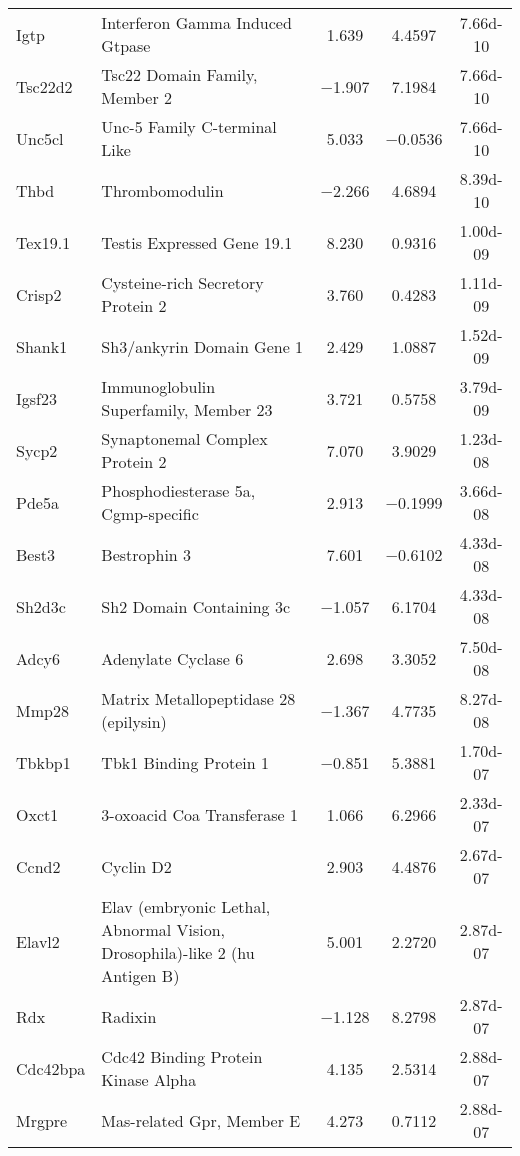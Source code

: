 {\begin{longtable}[l]{p{2.5cm}p{6.6cm}ccc}
Igtp	& Interferon Gamma Induced Gtpase	& \num{ 1.639}	& \num{ 4.4597}	& \num{7.66d-10}\\ 
Tsc22d2	& Tsc22 Domain Family, Member 2	& \num{-1.907}	& \num{ 7.1984}	& \num{7.66d-10}\\ 
Unc5cl	& Unc-5 Family C-terminal Like	& \num{ 5.033}	& \num{-0.0536}	& \num{7.66d-10}\\ 
Thbd	& Thrombomodulin	& \num{-2.266}	& \num{ 4.6894}	& \num{8.39d-10}\\ 
Tex19.1	& Testis Expressed Gene 19.1	& \num{ 8.230}	& \num{ 0.9316}	& \num{1.00d-09}\\ 
Crisp2	& Cysteine-rich Secretory Protein 2	& \num{ 3.760}	& \num{ 0.4283}	& \num{1.11d-09}\\ 
Shank1	& Sh3/ankyrin Domain Gene 1	& \num{ 2.429}	& \num{ 1.0887}	& \num{1.52d-09}\\ 
Igsf23	& Immunoglobulin Superfamily, Member 23	& \num{ 3.721}	& \num{ 0.5758}	& \num{3.79d-09}\\ 
Sycp2	& Synaptonemal Complex Protein 2	& \num{ 7.070}	& \num{ 3.9029}	& \num{1.23d-08}\\ 
Pde5a	& Phosphodiesterase 5a, Cgmp-specific	& \num{ 2.913}	& \num{-0.1999}	& \num{3.66d-08}\\ 
Best3	& Bestrophin 3	& \num{ 7.601}	& \num{-0.6102}	& \num{4.33d-08}\\ 
Sh2d3c	& Sh2 Domain Containing 3c	& \num{-1.057}	& \num{ 6.1704}	& \num{4.33d-08}\\ 
Adcy6	& Adenylate Cyclase 6	& \num{ 2.698}	& \num{ 3.3052}	& \num{7.50d-08}\\ 
Mmp28	& Matrix Metallopeptidase 28 (epilysin)	& \num{-1.367}	& \num{ 4.7735}	& \num{8.27d-08}\\ 
Tbkbp1	& Tbk1 Binding Protein 1	& \num{-0.851}	& \num{ 5.3881}	& \num{1.70d-07}\\ 
Oxct1	& 3-oxoacid Coa Transferase 1	& \num{ 1.066}	& \num{ 6.2966}	& \num{2.33d-07}\\ 
Ccnd2	& Cyclin D2	& \num{ 2.903}	& \num{ 4.4876}	& \num{2.67d-07}\\ 
Elavl2	& Elav (embryonic Lethal, Abnormal Vision, Drosophila)-like 2 (hu Antigen B)	& \num{ 5.001}	& \num{ 2.2720}	& \num{2.87d-07}\\ 
Rdx	& Radixin	& \num{-1.128}	& \num{ 8.2798}	& \num{2.87d-07}\\ 
Cdc42bpa	& Cdc42 Binding Protein Kinase Alpha	& \num{ 4.135}	& \num{ 2.5314}	& \num{2.88d-07}\\ 
Mrgpre	& Mas-related Gpr, Member E	& \num{ 4.273}	& \num{ 0.7112}	& \num{2.88d-07}\\ 

\end{longtable}}
